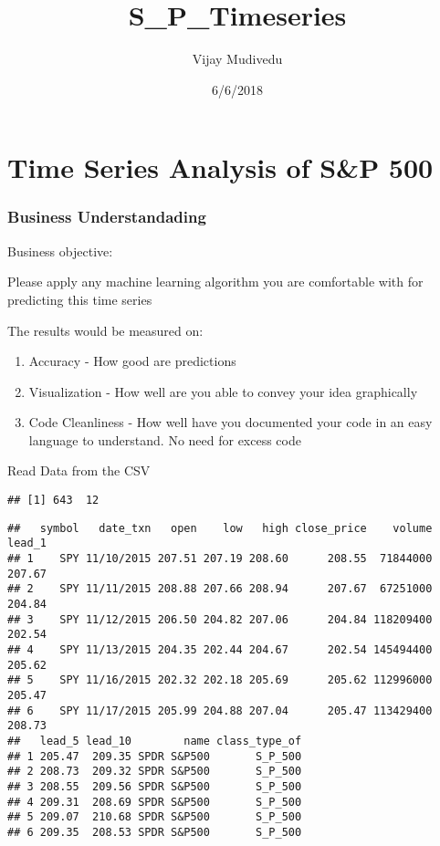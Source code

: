 \documentclass[]{article}
\title{S\_P\_Timeseries}
\author{Vijay Mudivedu}
\date{6/6/2018}
\providecommand{\tightlist}{%
  \setlength{\itemsep}{0pt}\setlength{\parskip}{0pt}}
\begin{document}
\maketitle

\section{Time Series Analysis of S\&P
500}\label{time-series-analysis-of-sp-500}

\subsubsection{Business Understandading}\label{business-understandading}

Business objective:

Please apply any machine learning algorithm you are comfortable with for
predicting this time series

The results would be measured on:

\begin{enumerate}
\def\labelenumi{\arabic{enumi}.}
\tightlist
\item
  Accuracy - How good are predictions
\item
  Visualization - How well are you able to convey your idea graphically
\item
  Code Cleanliness - How well have you documented your code in an easy
  language to understand. No need for excess code
\end{enumerate}

Read Data from the CSV

\begin{verbatim}
## [1] 643  12
\end{verbatim}

\begin{verbatim}
##   symbol   date_txn   open    low   high close_price    volume lead_1
## 1    SPY 11/10/2015 207.51 207.19 208.60      208.55  71844000 207.67
## 2    SPY 11/11/2015 208.88 207.66 208.94      207.67  67251000 204.84
## 3    SPY 11/12/2015 206.50 204.82 207.06      204.84 118209400 202.54
## 4    SPY 11/13/2015 204.35 202.44 204.67      202.54 145494400 205.62
## 5    SPY 11/16/2015 202.32 202.18 205.69      205.62 112996000 205.47
## 6    SPY 11/17/2015 205.99 204.88 207.04      205.47 113429400 208.73
##   lead_5 lead_10        name class_type_of
## 1 205.47  209.35 SPDR S&P500       S_P_500
## 2 208.73  209.32 SPDR S&P500       S_P_500
## 3 208.55  209.56 SPDR S&P500       S_P_500
## 4 209.31  208.69 SPDR S&P500       S_P_500
## 5 209.07  210.68 SPDR S&P500       S_P_500
## 6 209.35  208.53 SPDR S&P500       S_P_500
\end{verbatim}
\end{document}
